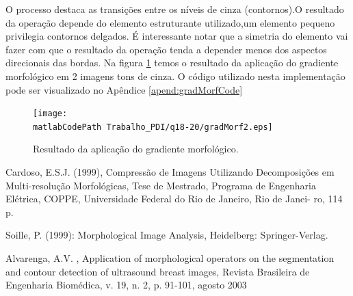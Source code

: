 \documentclass[
	article,			%
	11pt,				%
	oneside,			%
	a4paper,			%
	english,			%
	brazil,				%
	sumario=tradicional
	]{abntex2}
\newcommand{\matlabCodePath}{/home/clifte/git/Mestrado/Matlab/}
\begin{document}
O processo destaca as transições entre os níveis de cinza (contornos).O
resultado da operação depende do elemento estruturante utilizado,um elemento
pequeno privilegia contornos delgados.
É interessante notar que a simetria do elemento vai fazer com que o
resultado da operação tenda a depender menos dos aspectos direcionais das
bordas. Na figura \ref{fig:gradMorf} temos o resultado da aplicação do gradiente
morfológico em 2 imagens tons de cinza. O código utilizado nesta implementação
pode ser visualizado no Apêndice \ref{apend:gradMorfCode}

\begin{figure} 
		\centering 
		\texttt{[image: \\matlabCodePath
		Trabalho\_PDI/q18-20/gradMorf2.eps]}
		\caption{Resultado da aplicação do gradiente morfológico.}
		\label{fig:gradMorf}		
\end{figure}


% 


\begin{citacao}

\end{citacao}




Cardoso, E.S.J. (1999), Compressão de Imagens Utilizando
   Decomposições em Multi-resolução Morfológicas, Tese de
   Mestrado, Programa de Engenharia Elétrica, COPPE,
   Universidade Federal do Rio de Janeiro, Rio de Janei-
   ro, 114 p.
   
   Soille, P. (1999): Morphological Image Analysis, Heidelberg:
    Springer-Verlag.
   
Alvarenga, A.V. , Application of morphological operators on the
segmentation and contour detection of ultrasound breast images, Revista
Brasileira de Engenharia Biomédica, v. 19, n. 2, p. 91-101, agosto 2003


 
%
%

\end{document}
